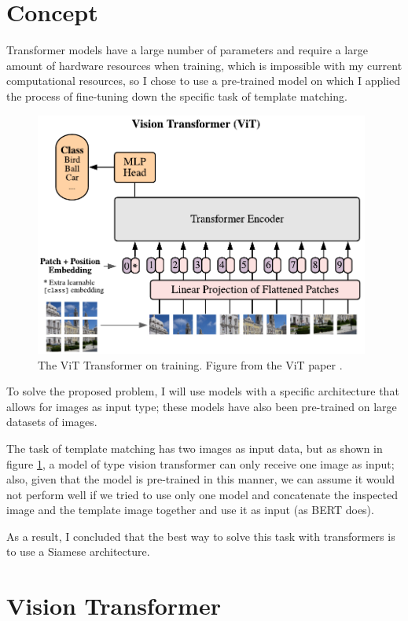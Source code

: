 \documentclass{report}[12pt, a4paper]
\begin{document}
\section{Concept}

Transformer models have a large number of parameters and require a large amount of hardware resources when training, which is impossible with my current computational resources, so I chose to use a pre-trained model on which I applied the process of fine-tuning down the specific task of template matching.

\begin{figure}[htp]
    \centering
    \includegraphics[width=11cm]{vit_transformer}
    \caption{The ViT Transformer on training. Figure from the ViT paper \cite{vit_paper}.}
    \label{fig:vit_transformer}
\end{figure}

To solve the proposed problem, I will use models with a specific architecture that allows for images as input type; these models have also been pre-trained on large datasets of images.


The task of template matching has two images as input data, but as shown in figure \ref{fig:vit_transformer}, a model of type vision transformer can only receive one image as input; also, given that the model is pre-trained in this manner, we can assume it would not perform well if we tried to use only one model and concatenate the inspected image and the template image together and use it as input (as BERT\cite{bert_paper} does).

As a result, I concluded that the best way to solve this task with transformers is to use a Siamese architecture.

\section{Vision Transformer}
\end{document}
